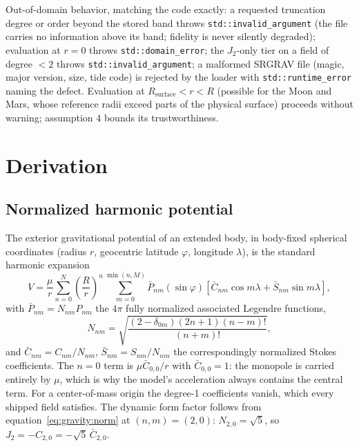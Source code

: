 Out-of-domain behavior, matching the code exactly: a requested
truncation degree or order beyond the stored band throws
\texttt{std::invalid\_argument} (the file carries no information above
its band; fidelity is never silently degraded); evaluation at $r = 0$
throws \texttt{std::domain\_error}; the $J_2$-only tier on a field of
degree $< 2$ throws \texttt{std::invalid\_argument}; a malformed SRGRAV
file (magic, major version, size, tide code) is rejected by the loader
with \texttt{std::runtime\_error} naming the defect. Evaluation at
$R_{\text{surface}} < r < R$ (possible for the Moon and Mars, whose
reference radii exceed parts of the physical surface) proceeds without
warning; assumption 4 bounds its trustworthiness.

\section{Derivation}
\label{sec:gravity:derivation}

\subsection{Normalized harmonic potential}

The exterior gravitational potential of an extended body, in body-fixed
spherical coordinates (radius $r$, geocentric latitude $\varphi$,
longitude $\lambda$), is the standard harmonic
expansion~\cite{vallado2013, pavlis2012}
\begin{equation}
  V = \frac{\mu}{r} \sum_{n=0}^{N} \left(\frac{R}{r}\right)^{\!n}
      \sum_{m=0}^{\min(n,M)} \bar{P}_{nm}(\sin\varphi)
      \left[ \bar{C}_{nm} \cos m\lambda + \bar{S}_{nm} \sin m\lambda
      \right],
  \label{eq:gravity:potential}
\end{equation}
with $\bar{P}_{nm} = N_{nm} P_{nm}$ the $4\pi$ fully normalized
associated Legendre functions,
\begin{equation}
  N_{nm} = \sqrt{\frac{(2 - \delta_{0m})(2n+1)(n-m)!}{(n+m)!}},
  \label{eq:gravity:norm}
\end{equation}
and $\bar{C}_{nm} = C_{nm}/N_{nm}$, $\bar{S}_{nm} = S_{nm}/N_{nm}$ the
correspondingly normalized Stokes coefficients. The $n = 0$ term is
$\mu \bar{C}_{0,0} / r$ with $\bar{C}_{0,0} = 1$: the monopole is
carried entirely by $\mu$, which is why the model's acceleration always
contains the central term. For a center-of-mass origin the degree-1
coefficients vanish, which every shipped field satisfies. The dynamic
form factor follows from equation~\eqref{eq:gravity:norm} at
$(n,m) = (2,0)$: $N_{2,0} = \sqrt{5}$, so
$J_2 = -C_{2,0} = -\sqrt{5}\,\bar{C}_{2,0}$.

